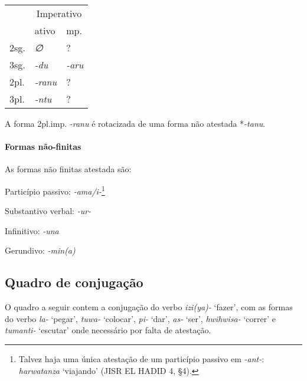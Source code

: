 \begin{center}
	\begin{tabular}[c]{lll}
		\toprule
		     & \multicolumn{2}{c}{Imperativo}               \\
		     & ativo                          & mp.         \\
		\midrule
		2sg. & \emph{∅}                       & {?}         \\
		3sg. & \emph{-du}                     & \emph{-aru} \\
		\midrule
		2pl. & \emph{-ranu}                   & {?}         \\
		3pl. & \emph{-ntu}                    & {?}         \\
		\bottomrule
	\end{tabular}
\end{center}

\noindent A forma 2pl.imp. \emph{-ranu} é rotacizada de uma forma não atestada
*\emph{-tanu}.

\paragraph{Formas não-finitas}
As formas não finitas atestada são:

\begin{compactitem}
	\item Particípio passivo: \emph{-ama\slash{}i-}\footnote{Talvez haja uma única
		atestação de um particípio passivo em \emph{-ant-}: \emph{harwatanza}
		`viajando' (JISR EL HADID 4, §4).}
	\item Substantivo verbal: \emph{-ur-}
	\item Infinitivo: \emph{-una}
	\item Gerundivo: \emph{-min{(a)}}
\end{compactitem}



\subsection{Quadro de conjugação}

O quadro a seguir contem a conjugação do verbo \emph{izi{(ya)}-} `fazer', com as
formas do verbo \emph{la-} `pegar', \emph{tuwa-} `colocar', \emph{pi-} `dar',
\emph{as-} `ser', \emph{hwihwisa-}
`correr' e \emph{tumanti-} `escutar' onde necessário por falta de atestação.

